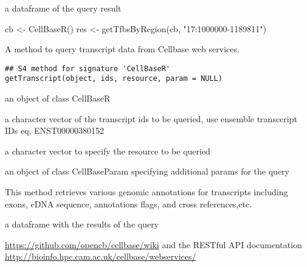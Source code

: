 \documentclass[letterpaper]{book}
\begin{document}
%
\begin{Value}
a dataframe of the query result
\end{Value}
%
\begin{Examples}
\begin{ExampleCode}
cb <- CellBaseR()
res <- getTfbsByRegion(cb, "17:1000000-1189811")
\end{ExampleCode}
\end{Examples}
%
\begin{Description}\relax
A method to query transcript data from Cellbase web services.
\end{Description}
%
\begin{Usage}
\begin{verbatim}
## S4 method for signature 'CellBaseR'
getTranscript(object, ids, resource, param = NULL)
\end{verbatim}
\end{Usage}
%
\begin{Arguments}
\begin{ldescription}
\item[\code{object}] an object of class CellBaseR

\item[\code{ids}] a character vector of the transcript ids to be queried, use 
ensemble transccript IDs eq, ENST00000380152

\item[\code{resource}] a character vector to specify the resource to be queried

\item[\code{param}] an object of class CellBaseParam specifying additional params 
for the query
\end{ldescription}
\end{Arguments}
%
\begin{Details}\relax
This method retrieves various genomic annotations for transcripts
including exons, cDNA sequence, annotations flags, and cross references,etc.
\end{Details}
%
\begin{Value}
a dataframe with the results of the query
\end{Value}
%
\begin{SeeAlso}\relax
\url{https://github.com/opencb/cellbase/wiki} 
and the RESTful API documentation 
\url{http://bioinfo.hpc.cam.ac.uk/cellbase/webservices/}
\end{SeeAlso}
\end{document}
